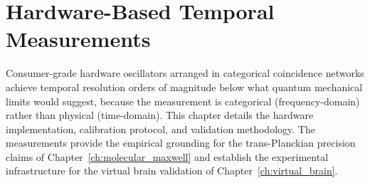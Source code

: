 \chapter{Hardware-Based Temporal Measurements}
\label{ch:hardware_temporal}


\begin{chapterabstract}
Consumer-grade hardware oscillators arranged in categorical coincidence networks achieve temporal resolution orders of magnitude below what quantum mechanical limits would suggest, because the measurement is categorical (frequency-domain) rather than physical (time-domain). This chapter details the hardware implementation, calibration protocol, and validation methodology. The measurements provide the empirical grounding for the trans-Planckian precision claims of Chapter~\ref{ch:molecular_maxwell} and establish the experimental infrastructure for the virtual brain validation of Chapter~\ref{ch:virtual_brain}.
\end{chapterabstract}


